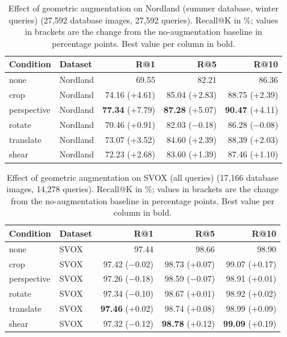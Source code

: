 \begin{table}[htbp]
\centering
\caption{Effect of geometric augmentation on Nordland (summer database, winter queries) (27,592 database images, 27,592 queries). Recall@K in \%; values in brackets are the change from the no-augmentation baseline in percentage points. Best value per column in bold.}
\label{tab:geoaug_nordland}
\begin{tabular}{llrrr}
\toprule
Condition & Dataset & R@1 & R@5 & R@10 \\
\midrule
none & Nordland & 69.55 & 82.21 & 86.36 \\
\midrule
crop & Nordland & 74.16 {\scriptsize (+4.61)} & 85.04 {\scriptsize (+2.83)} & 88.75 {\scriptsize (+2.39)} \\
perspective & Nordland & \textbf{77.34} {\scriptsize (+7.79)} & \textbf{87.28} {\scriptsize (+5.07)} & \textbf{90.47} {\scriptsize (+4.11)} \\
rotate & Nordland & 70.46 {\scriptsize (+0.91)} & 82.03 {\scriptsize ($-$0.18)} & 86.28 {\scriptsize ($-$0.08)} \\
translate & Nordland & 73.07 {\scriptsize (+3.52)} & 84.60 {\scriptsize (+2.39)} & 88.39 {\scriptsize (+2.03)} \\
shear & Nordland & 72.23 {\scriptsize (+2.68)} & 83.60 {\scriptsize (+1.39)} & 87.46 {\scriptsize (+1.10)} \\
\bottomrule
\end{tabular}
\end{table}

\begin{table}[htbp]
\centering
\caption{Effect of geometric augmentation on SVOX (all queries) (17,166 database images, 14,278 queries). Recall@K in \%; values in brackets are the change from the no-augmentation baseline in percentage points. Best value per column in bold.}
\label{tab:geoaug_svox}
\begin{tabular}{llrrr}
\toprule
Condition & Dataset & R@1 & R@5 & R@10 \\
\midrule
none & SVOX & 97.44 & 98.66 & 98.90 \\
\midrule
crop & SVOX & 97.42 {\scriptsize ($-$0.02)} & 98.73 {\scriptsize (+0.07)} & 99.07 {\scriptsize (+0.17)} \\
perspective & SVOX & 97.26 {\scriptsize ($-$0.18)} & 98.59 {\scriptsize ($-$0.07)} & 98.91 {\scriptsize (+0.01)} \\
rotate & SVOX & 97.34 {\scriptsize ($-$0.10)} & 98.67 {\scriptsize (+0.01)} & 98.92 {\scriptsize (+0.02)} \\
translate & SVOX & \textbf{97.46} {\scriptsize (+0.02)} & 98.74 {\scriptsize (+0.08)} & 98.99 {\scriptsize (+0.09)} \\
shear & SVOX & 97.32 {\scriptsize ($-$0.12)} & \textbf{98.78} {\scriptsize (+0.12)} & \textbf{99.09} {\scriptsize (+0.19)} \\
\bottomrule
\end{tabular}
\end{table}

